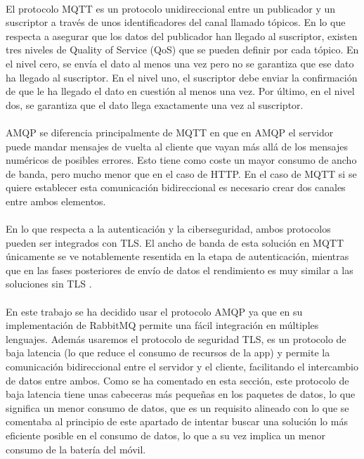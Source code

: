 \paragraph{}
El protocolo MQTT es un protocolo unidireccional entre un publicador y un suscriptor a través de unos identificadores del canal llamado tópicos. En lo que respecta a asegurar que los datos del publicador han llegado al suscriptor, existen tres niveles de Quality of Service (QoS) que se pueden definir por cada tópico. En el nivel cero, se envía el dato al menos una vez pero no se garantiza que ese dato ha llegado al suscriptor. En el nivel uno, el suscriptor debe enviar la confirmación de que le ha llegado el dato en cuestión al menos una vez. Por último, en el nivel dos, se garantiza que el dato llega exactamente una vez al suscriptor.

\paragraph{}
AMQP se diferencia principalmente de MQTT en que en AMQP el servidor puede mandar mensajes de vuelta al cliente que vayan más allá de los mensajes numéricos de posibles errores. Esto tiene como coste un mayor consumo de ancho de banda, pero mucho menor que en el caso de HTTP. En el caso de MQTT si se quiere establecer esta comunicación bidireccional es necesario crear dos canales entre ambos elementos.

\paragraph{}
En lo que respecta a la autenticación y la ciberseguridad, ambos protocolos pueden ser integrados con TLS. El ancho de banda de esta solución en MQTT únicamente se ve notablemente resentida en la etapa de autenticación, mientras que en las fases posteriores de envío de datos el rendimiento es muy similar a las soluciones sin TLS \citep{hivemq}.

\paragraph{}
En este trabajo se ha decidido usar el protocolo AMQP ya que en su implementación de RabbitMQ permite una fácil integración en múltiples lenguajes. Además usaremos el protocolo de seguridad TLS, es un protocolo de baja latencia (lo que reduce el consumo de recursos de la app) y permite la comunicación bidireccional entre el servidor y el cliente, facilitando el intercambio de datos entre ambos. Como se ha comentado en esta sección, este protocolo de baja latencia tiene unas cabeceras más pequeñas en los paquetes de datos, lo que significa un menor consumo de datos, que es un requisito alineado con lo que se comentaba al principio de este apartado de intentar buscar una solución lo más eficiente posible en el consumo de datos, lo que a su vez implica un menor consumo de la batería del móvil.

